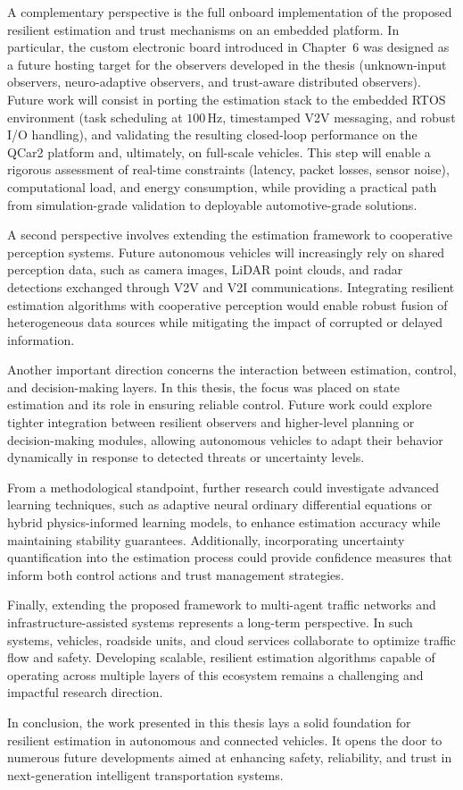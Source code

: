 A complementary perspective is the full onboard implementation of the proposed resilient estimation and trust mechanisms on an embedded platform.
In particular, the custom electronic board introduced in Chapter~6 was designed as a future hosting target for the observers developed in the thesis (unknown-input observers, neuro-adaptive observers, and trust-aware distributed observers).
Future work will consist in porting the estimation stack to the embedded RTOS environment (task scheduling at $100\,\mathrm{Hz}$, timestamped V2V messaging, and robust I/O handling), and validating the resulting closed-loop performance on the QCar2 platform and, ultimately, on full-scale vehicles.
This step will enable a rigorous assessment of real-time constraints (latency, packet losses, sensor noise), computational load, and energy consumption, while providing a practical path from simulation-grade validation to deployable automotive-grade solutions.

A second perspective involves extending the estimation framework to cooperative perception systems. Future autonomous vehicles will increasingly rely on shared perception data, such as camera images, LiDAR point clouds, and radar detections exchanged through V2V and V2I communications. Integrating resilient estimation algorithms with cooperative perception would enable robust fusion of heterogeneous data sources while mitigating the impact of corrupted or delayed information.

Another important direction concerns the interaction between estimation, control, and decision-making layers. In this thesis, the focus was placed on state estimation and its role in ensuring reliable control. 
Future work could explore tighter integration between resilient observers and higher-level planning or decision-making modules, allowing autonomous vehicles to adapt their behavior dynamically in response to detected threats or uncertainty levels.

From a methodological standpoint, further research could investigate advanced learning techniques, such as adaptive neural ordinary differential equations or hybrid physics-informed learning models, to enhance estimation accuracy while maintaining stability guarantees. Additionally, incorporating uncertainty quantification into the estimation process could provide confidence measures that inform both control actions and trust management strategies.

Finally, extending the proposed framework to multi-agent traffic networks and infrastructure-assisted systems represents a long-term perspective. In such systems, vehicles, roadside units, and cloud services collaborate to optimize traffic flow and safety. Developing scalable, resilient estimation algorithms capable of operating across multiple layers of this ecosystem remains a challenging and impactful research direction.

In conclusion, the work presented in this thesis lays a solid foundation for resilient estimation in autonomous and connected vehicles. It opens the door to numerous future developments aimed at enhancing safety, reliability, and trust in next-generation intelligent transportation systems.
